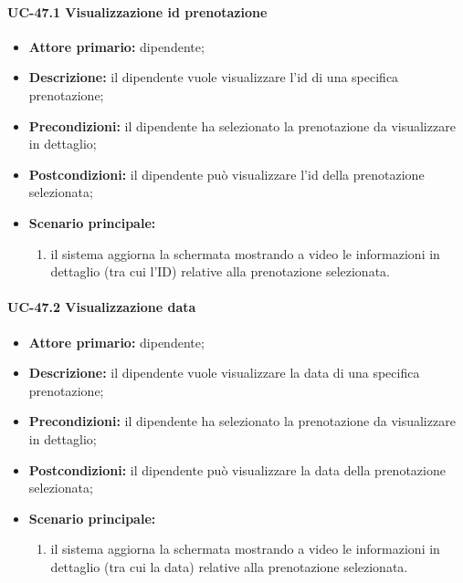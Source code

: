 \paragraph{UC-47.1 Visualizzazione id prenotazione}
    
    \begin{itemize}
        \item \textbf{Attore primario:} dipendente;

        \item \textbf{Descrizione:} il dipendente vuole visualizzare l'id di una specifica prenotazione;

        \item \textbf{Precondizioni:} il dipendente ha selezionato la prenotazione da visualizzare in dettaglio;

        \item \textbf{Postcondizioni:} il dipendente può visualizzare l'id della prenotazione selezionata;

        \item \textbf{Scenario principale:}
            \begin{enumerate}
                 \item il sistema aggiorna la schermata mostrando a video le informazioni in dettaglio (tra cui l'ID) relative alla prenotazione selezionata.
            \end{enumerate}
    \end{itemize}

\paragraph{UC-47.2 Visualizzazione data}

    \begin{itemize}
        \item \textbf{Attore primario:} dipendente;

        \item \textbf{Descrizione:} il dipendente vuole visualizzare la data di una specifica prenotazione;

        \item \textbf{Precondizioni:} il dipendente ha selezionato la prenotazione da visualizzare in dettaglio;

        \item \textbf{Postcondizioni:} il dipendente può visualizzare la data della prenotazione selezionata;

        \item \textbf{Scenario principale:}
            \begin{enumerate}
                 \item il sistema aggiorna la schermata mostrando a video le informazioni in dettaglio (tra cui la data) relative alla prenotazione selezionata.
            \end{enumerate}
    \end{itemize} 

